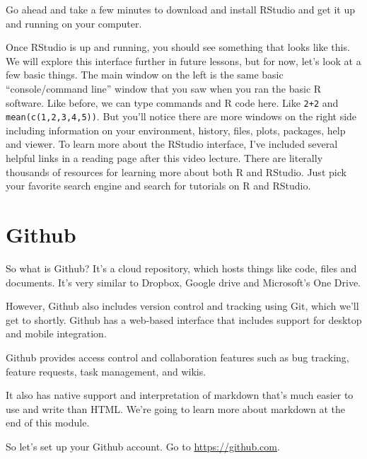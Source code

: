 \documentclass[]{book}
\theoremstyle{definition}
\theoremstyle{definition}
\theoremstyle{definition}
\theoremstyle{remark}
\begin{document}
Go ahead and take a few minutes to download and install RStudio and get
it up and running on your computer.

Once RStudio is up and running, you should see something that looks like
this. We will explore this interface further in future lessons, but for
now, let's look at a few basic things. The main window on the left is
the same basic ``console/command line'' window that you saw when you ran
the basic R software. Like before, we can type commands and R code here.
Like \texttt{2+2} and \texttt{mean(c(1,2,3,4,5))}. But you'll notice
there are more windows on the right side including information on your
environment, history, files, plots, packages, help and viewer. To learn
more about the RStudio interface, I've included several helpful links in
a reading page after this video lecture. There are literally thousands
of resources for learning more about both R and RStudio. Just pick your
favorite search engine and search for tutorials on R and RStudio.

\section{Github}\label{github}

So what is Github? It's a cloud repository, which hosts things like
code, files and documents. It's very similar to Dropbox, Google drive
and Microsoft's One Drive.

However, Github also includes version control and tracking using Git,
which we'll get to shortly. Github has a web-based interface that
includes support for desktop and mobile integration.

Github provides access control and collaboration features such as bug
tracking, feature requests, task management, and wikis.

It also has native support and interpretation of markdown that's much
easier to use and write than HTML. We're going to learn more about
markdown at the end of this module.

So let's set up your Github account. Go to \url{https://github.com}.
\end{document}

